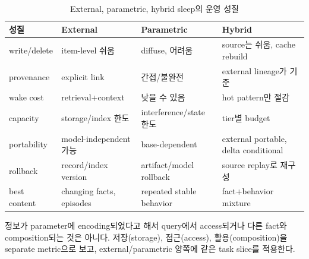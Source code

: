 \begin{table}[htbp]
\centering
\caption{External, parametric, hybrid sleep의 운영 성질}
\label{tab:mechanism-properties}
\small
\begin{tabularx}{\textwidth}{p{} X X X}
\toprule
성질 & External & Parametric & Hybrid \\
\midrule
write/delete & item-level 쉬움 & diffuse, 어려움 & source는 쉬움, cache rebuild \\
provenance & explicit link & 간접/불완전 & external lineage가 기준 \\
wake cost & retrieval+context & 낮을 수 있음 & hot pattern만 절감 \\
capacity & storage/index 한도 & interference/state 한도 & tier별 budget \\
portability & model-independent 가능 & base-dependent & external portable, delta conditional \\
rollback & record/index version & artifact/model rollback & source replay로 재구성 \\
best content & changing facts, episodes & repeated stable behavior & fact+behavior mixture \\
\bottomrule
\end{tabularx}
\end{table}

\begin{cautionbox}[“기억했다”의 세 수준]
정보가 parameter에 encoding되었다고 해서 query에서 access되거나 다른 fact와 composition되는 것은 아니다.
저장(storage), 접근(access), 활용(composition)을 separate metric으로 보고, external/parametric 양쪽에 같은
task slice를 적용한다.
\end{cautionbox}
